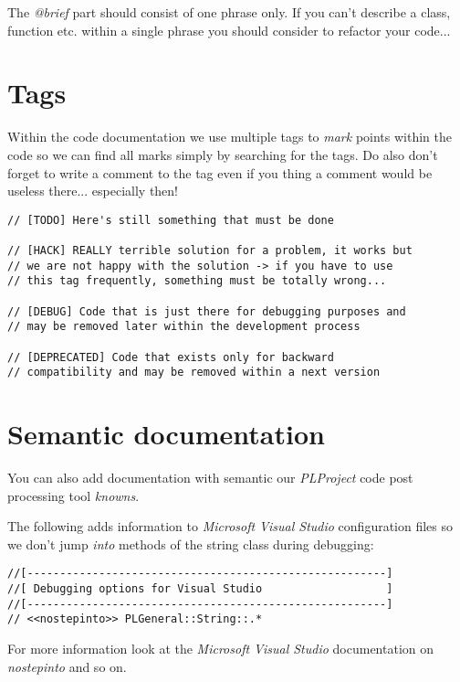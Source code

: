 The \emph{@brief} part should consist of one phrase only. If you can't describe a class, function etc. within a single phrase you should consider to refactor your code...




\section{Tags}
Within the code documentation we use multiple tags to \emph{mark} points within the code so we can find all marks simply by searching for the tags. Do also don't forget to write a comment to the tag even if you thing a comment would be useless there... especially then!

\begin{lstlisting}[caption=Comment tags]
// [TODO] Here's still something that must be done

// [HACK] REALLY terrible solution for a problem, it works but
// we are not happy with the solution -> if you have to use
// this tag frequently, something must be totally wrong...

// [DEBUG] Code that is just there for debugging purposes and
// may be removed later within the development process

// [DEPRECATED] Code that exists only for backward
// compatibility and may be removed within a next version
\end{lstlisting}




\section{Semantic documentation}
You can also add documentation with semantic our \emph{PLProject} code post processing tool \emph{knowns}.

The following adds information to \emph{Microsoft Visual Studio} configuration files so we don't jump \emph{into} methods of the string class during debugging:

\begin{lstlisting}[caption=Semantic documentation]
//[-------------------------------------------------------]
//[ Debugging options for Visual Studio                   ]
//[-------------------------------------------------------]
// <<nostepinto>> PLGeneral::String::.*
\end{lstlisting}

For more information look at the \emph{Microsoft Visual Studio} documentation on \emph{nostepinto} and so on.
